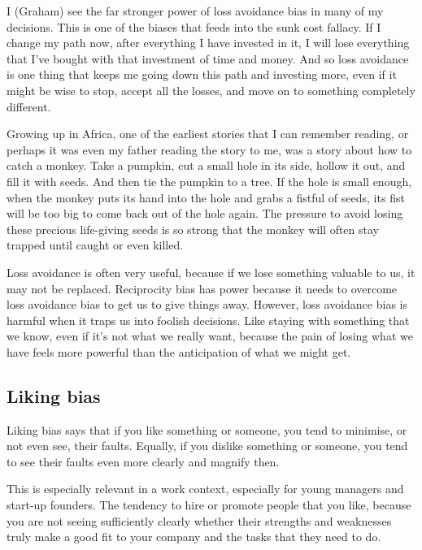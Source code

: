 \begin{longstoryblock}
I (Graham) see the far stronger power of loss avoidance bias in many of my decisions. This is one of the biases that feeds into the sunk cost fallacy. If I change my path now, after everything I have invested in it, I will lose everything that I've bought with that investment of time and money. And so loss avoidance is one thing that keeps me going down this path and investing more, even if it might be wise to stop, accept all the losses, and move on to something completely different.


Growing up in Africa, one of the earliest stories that I can remember reading, or perhaps it was even my father reading the story to me, was a story about how to catch a monkey. Take a pumpkin, cut a small hole in its side, hollow it out, and fill it with seeds. And then tie the pumpkin to a tree. If the hole is small enough, when the monkey puts its hand into the hole and grabs a fistful of seeds, its fist will be too big to come back out of the hole again. The pressure to avoid losing these precious life-giving seeds is so strong that the monkey will often stay trapped until caught or even killed.
\end{longstoryblock}


Loss avoidance is often very useful, because if we lose something valuable to us, it may not be replaced. Reciprocity bias has power because it needs to overcome loss avoidance bias to get us to give things away. However, loss avoidance bias is harmful when it traps us into foolish decisions. Like staying with something that we know, even if it's not what we really want, because the pain of losing what we have feels more powerful than the anticipation of what we might get.


\subsection{Liking bias}
Liking bias says that if you like something or someone, you tend to minimise, or not even see, their faults. Equally, if you dislike something or someone, you tend to see their faults even more clearly and magnify then.


This is especially relevant in a work context, especially for young managers and start-up founders. The tendency to hire or promote people that you like, because you are not seeing sufficiently clearly whether their strengths and weaknesses truly make a good fit to your company and the tasks that they need to do. 


